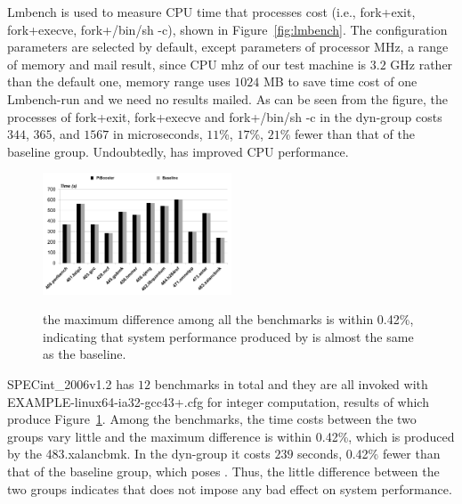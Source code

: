 Lmbench is used to measure CPU time that processes cost (i.e., fork+exit, fork+execve, fork+/bin/sh -c), shown in Figure~\ref{fig:lmbench}. The configuration parameters are selected by default, except parameters of processor MHz, a range of memory and mail result, since CPU mhz of our test machine is $3.2$ GHz rather than the default one, memory range uses $1024$ MB to save time cost of one Lmbench-run and we need no results mailed. As can be seen from the figure, the processes of fork+exit, fork+execve and fork+/bin/sh -c in the dyn-\name group costs $344$, $365$, and $1567$ in microseconds, $11$\%, $17$\%, $21$\% fewer than that of the baseline group. Undoubtedly, \name has improved CPU performance.

\begin{figure}[htp]
\centering
\includegraphics[width=0.5\textwidth]{image/macro/spec.png} \\
\caption{the maximum difference among all the benchmarks is within 0.42\%, indicating that system performance produced by \name is almost the same as the baseline.}
\label{fig:spec}
\end{figure}

SPECint\_2006v1.2 has $12$ benchmarks in total and they are all invoked with EXAMPLE-linux64-ia32-gcc43+.cfg for integer computation, results of which produce Figure~\ref{fig:spec}. Among the benchmarks, the time costs between the two groups vary little and the maximum difference is within 0.42\%, which is produced by the 483.xalancbmk. In the dyn-\name group it costs $239$ seconds, 0.42\% fewer than that of the baseline group, which poses . Thus, the little difference between the two groups indicates that \name does not impose any bad effect on system performance.





